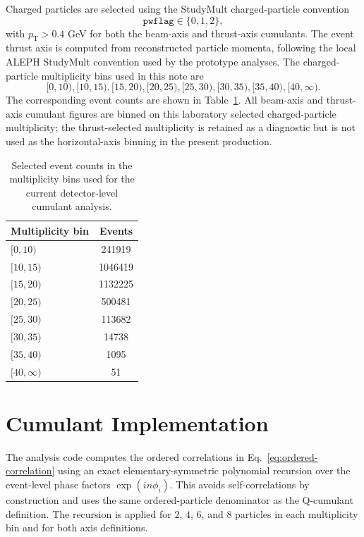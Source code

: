 \documentclass{article}
\newcommand{\pT}{\ensuremath{p_{\mathrm{T}}}}
\begin{document}
Charged particles are selected using the StudyMult charged-particle convention
\begin{equation}
  \texttt{pwflag}\in\{0,1,2\},
\end{equation}
with \(\pT>0.4\) GeV for both the beam-axis and thrust-axis cumulants. The
event thrust axis is computed from reconstructed particle momenta, following
the local ALEPH StudyMult convention used by the prototype analyses. The
charged-particle multiplicity bins used in this note are
\[
  [0,10), [10,15), [15,20), [20,25), [25,30), [30,35), [35,40), [40,\infty).
\]
The corresponding event counts are shown in Table~\ref{tab:event-counts}.
All beam-axis and thrust-axis cumulant figures are binned on this laboratory selected charged-particle multiplicity; the thrust-selected multiplicity is retained as a diagnostic but is not used as the horizontal-axis binning in the present production.

\begin{table}[htbp]
\centering
\caption{Selected event counts in the multiplicity bins used for the current
detector-level cumulant analysis.}
\label{tab:event-counts}
\begin{tabular}{lc}
\toprule
Multiplicity bin & Events \\
\midrule
\([0,10)\) & 241919 \\
\([10,15)\) & 1046419 \\
\([15,20)\) & 1132225 \\
\([20,25)\) & 500481 \\
\([25,30)\) & 113682 \\
\([30,35)\) & 14738 \\
\([35,40)\) & 1095 \\
\([40,\infty)\) & 51 \\
\bottomrule
\end{tabular}
\end{table}

\section{Cumulant Implementation}
\label{sec:method}

The analysis code computes the ordered correlations in
Eq.~\eqref{eq:ordered-correlation} using an exact elementary-symmetric
polynomial recursion over the event-level phase factors
\(\exp(in\phi_i)\). This avoids self-correlations by construction and uses the
same ordered-particle denominator as the Q-cumulant definition. The recursion
is applied for \(2\), \(4\), \(6\), and \(8\) particles in each multiplicity bin
and for both axis definitions.
\end{document}
